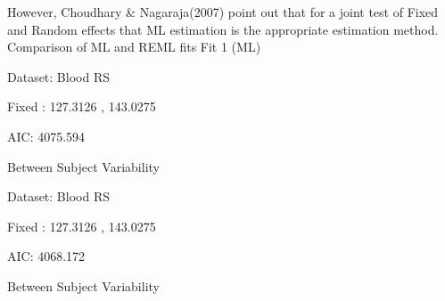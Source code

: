 However, Choudhary & Nagaraja(2007) point out  that for a joint test of Fixed and Random effects that ML estimation is the appropriate estimation method.
Comparison of ML and REML fits
Fit 1 (ML)

Dataset: Blood RS

Fixed : 127.3126 , 143.0275

AIC: 4075.594

Between Subject Variability


Dataset: Blood RS

Fixed : 127.3126 , 143.0275

AIC: 4068.172

Between Subject Variability



